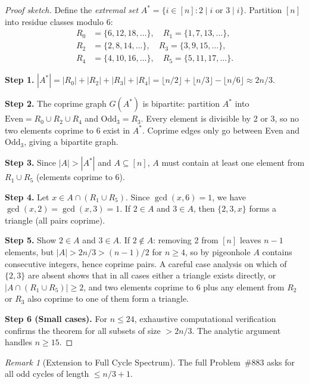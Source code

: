 \documentclass[11pt,a4paper]{article}
\theoremstyle{definition}
\theoremstyle{remark}
\newtheorem{remark}[theorem]{Remark}
\begin{document}
\begin{proof}[Proof sketch]
Define the \emph{extremal set} $A^* = \{i \in [n] : 2 \mid i \text{ or }
3 \mid i\}$. Partition $[n]$ into residue classes modulo 6:
\begin{align*}
R_0 &= \{6,12,18,\ldots\}, \quad R_1 = \{1,7,13,\ldots\}, \\
R_2 &= \{2,8,14,\ldots\}, \quad R_3 = \{3,9,15,\ldots\}, \\
R_4 &= \{4,10,16,\ldots\}, \quad R_5 = \{5,11,17,\ldots\}.
\end{align*}

\textbf{Step 1.} $|A^*| = |R_0| + |R_2| + |R_3| + |R_4| = \lfloor n/2\rfloor
+ \lfloor n/3 \rfloor - \lfloor n/6 \rfloor \approx 2n/3$.

\textbf{Step 2.} The coprime graph $G(A^*)$ is bipartite: partition $A^*$ into
$\text{Even} = R_0 \cup R_2 \cup R_4$ and $\text{Odd}_3 = R_3$. Every element
is divisible by 2 or 3, so no two elements coprime to 6 exist in $A^*$.
Coprime edges only go between Even and $\text{Odd}_3$, giving a bipartite graph.

\textbf{Step 3.} Since $|A| > |A^*|$ and $A \subseteq [n]$, $A$ must contain
at least one element from $R_1 \cup R_5$ (elements coprime to 6).

\textbf{Step 4.} Let $x \in A \cap (R_1 \cup R_5)$. Since $\gcd(x,6) = 1$,
we have $\gcd(x,2) = \gcd(x,3) = 1$. If $2 \in A$ and $3 \in A$, then
$\{2, 3, x\}$ forms a triangle (all pairs coprime).

\textbf{Step 5.} Show $2 \in A$ and $3 \in A$. If $2 \notin A$: removing 2
from $[n]$ leaves $n-1$ elements, but $|A| > 2n/3 > (n-1)/2$ for $n \geq 4$,
so by pigeonhole $A$ contains consecutive integers, hence coprime pairs.
A careful case analysis on which of $\{2,3\}$ are absent shows that in all
cases either a triangle exists directly, or $|A \cap (R_1 \cup R_5)| \geq 2$,
and two elements coprime to 6 plus any element from $R_2$ or $R_3$ also
coprime to one of them form a triangle.

\textbf{Step 6 (Small cases).} For $n \leq 24$, exhaustive computational
verification confirms the theorem for all subsets of size $> 2n/3$. The
analytic argument handles $n \geq 15$.
\end{proof}

\begin{remark}[Extension to Full Cycle Spectrum]
The full Problem~\#883 asks for all odd cycles of length $\leq n/3 + 1$.
\end{remark}
\end{document}
